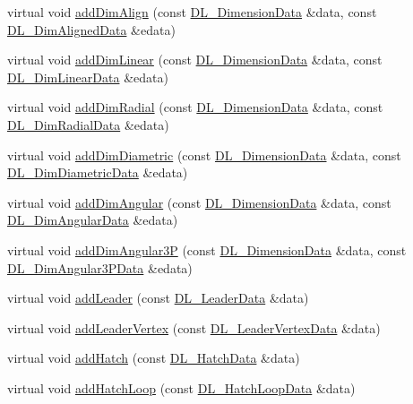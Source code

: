 \begin{DoxyCompactItemize}
\item 
virtual void \hyperlink{classRS__FilterDXF_a347f327191d4159fa9d2eacb2c460cea}{add\-Dim\-Align} (const \hyperlink{structDL__DimensionData}{D\-L\-\_\-\-Dimension\-Data} \&data, const \hyperlink{structDL__DimAlignedData}{D\-L\-\_\-\-Dim\-Aligned\-Data} \&edata)
\item 
virtual void \hyperlink{classRS__FilterDXF_acdbc5a560ca667a28b4d084eece7b06a}{add\-Dim\-Linear} (const \hyperlink{structDL__DimensionData}{D\-L\-\_\-\-Dimension\-Data} \&data, const \hyperlink{structDL__DimLinearData}{D\-L\-\_\-\-Dim\-Linear\-Data} \&edata)
\item 
virtual void \hyperlink{classRS__FilterDXF_a99e65dc9c7d7e431ff02f013bb2c3e88}{add\-Dim\-Radial} (const \hyperlink{structDL__DimensionData}{D\-L\-\_\-\-Dimension\-Data} \&data, const \hyperlink{structDL__DimRadialData}{D\-L\-\_\-\-Dim\-Radial\-Data} \&edata)
\item 
virtual void \hyperlink{classRS__FilterDXF_a3cf10c55981e83bca0dde1ff2b657bb9}{add\-Dim\-Diametric} (const \hyperlink{structDL__DimensionData}{D\-L\-\_\-\-Dimension\-Data} \&data, const \hyperlink{structDL__DimDiametricData}{D\-L\-\_\-\-Dim\-Diametric\-Data} \&edata)
\item 
virtual void \hyperlink{classRS__FilterDXF_ab0479c8b2a86c2eef82cd228e036792a}{add\-Dim\-Angular} (const \hyperlink{structDL__DimensionData}{D\-L\-\_\-\-Dimension\-Data} \&data, const \hyperlink{structDL__DimAngularData}{D\-L\-\_\-\-Dim\-Angular\-Data} \&edata)
\item 
virtual void \hyperlink{classRS__FilterDXF_a12d47d646e77c99047d5366fc5bfd221}{add\-Dim\-Angular3\-P} (const \hyperlink{structDL__DimensionData}{D\-L\-\_\-\-Dimension\-Data} \&data, const \hyperlink{structDL__DimAngular3PData}{D\-L\-\_\-\-Dim\-Angular3\-P\-Data} \&edata)
\item 
virtual void \hyperlink{classRS__FilterDXF_aa5e0dfe59c8804672193f5d0c9f6a4ea}{add\-Leader} (const \hyperlink{structDL__LeaderData}{D\-L\-\_\-\-Leader\-Data} \&data)
\item 
virtual void \hyperlink{classRS__FilterDXF_a466c1a7eeb8c856b471470f28293f627}{add\-Leader\-Vertex} (const \hyperlink{structDL__LeaderVertexData}{D\-L\-\_\-\-Leader\-Vertex\-Data} \&data)
\item 
virtual void \hyperlink{classRS__FilterDXF_a3097436b4e4c6014cb886385875e66a9}{add\-Hatch} (const \hyperlink{structDL__HatchData}{D\-L\-\_\-\-Hatch\-Data} \&data)
\item 
virtual void \hyperlink{classRS__FilterDXF_a5ab49680d35a4fa79bc64dd754e72fe9}{add\-Hatch\-Loop} (const \hyperlink{structDL__HatchLoopData}{D\-L\-\_\-\-Hatch\-Loop\-Data} \&data)

\end{DoxyCompactItemize}
